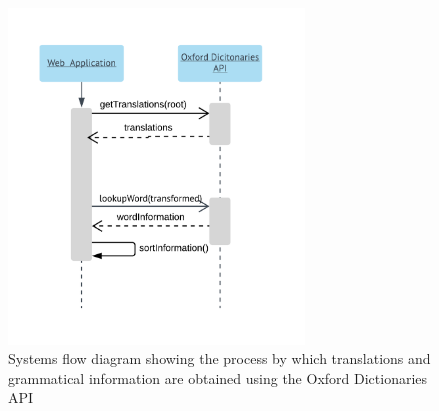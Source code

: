 \begin{figure}
	\caption[Systems Flow Diagram of the Oxford Dictionaries API]{Systems flow diagram showing the process by which translations and grammatical information are obtained using the Oxford Dictionaries API}
	\label{fig:odsf}
	\begin{center}
	\includegraphics[width=0.7\textwidth]{Graphics/SystemsFlowOxford}
\end{center}
\end{figure}